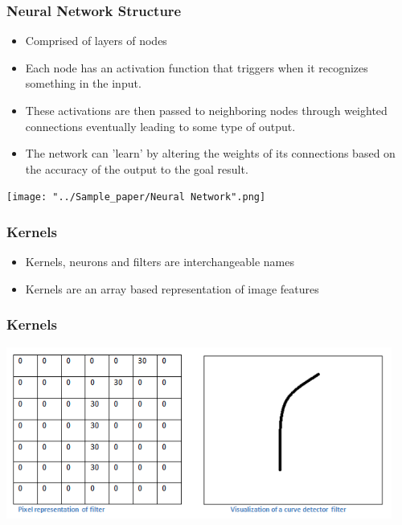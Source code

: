 \documentclass{beamer}
\begin{document}
\begin{frame}
  \frametitle{Neural Network Structure}
  \begin{itemize}
	\item Comprised of layers of nodes
	\pause
	\item Each node has an activation function that triggers when it recognizes something in the input.
	\pause
	\item These activations are then passed to neighboring nodes through weighted connections eventually leading to some type of output.
	\pause
	\item The network can 'learn' by altering the weights of its connections based on the accuracy of the output to the goal result.
  \end{itemize}
\end{frame}

\begin{frame}
    \texttt{[image: "../Sample\_paper/Neural Network".png]}
\end{frame}

\begin{frame}
  \frametitle{Kernels}
  
  \begin{itemize}
	\item Kernels, neurons and filters are interchangeable names
	\pause
	\item Kernels are an array based representation of image features
  \end{itemize}
  
\end{frame}

\begin{frame}
  \frametitle{Kernels}
   \includegraphics[width=0.95\textwidth]{Filter.png}
       \\
\end{frame}
\end{document}
